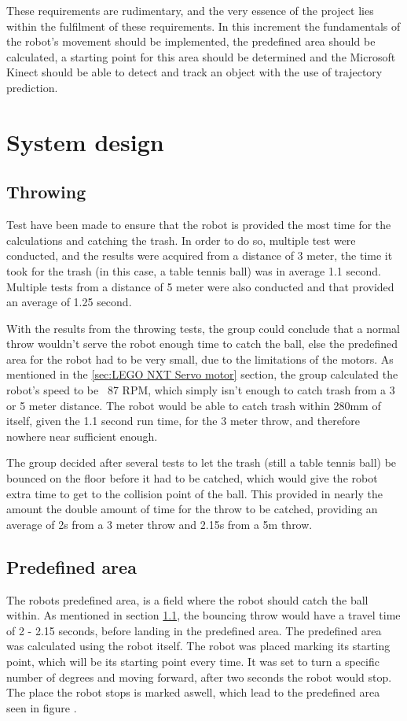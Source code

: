 These requirements are rudimentary, and the very essence of the project lies within the fulfilment of these requirements. In this increment the fundamentals of the robot’s movement should be implemented, the predefined area should be calculated, a starting point for this area should be determined and the Microsoft Kinect should be able to detect and track an object with the use of trajectory prediction.

\section{System design}
\label{sec:i1System Design}

\subsection{Throwing}
\label{sec:i1Throwing}
Test have been made to ensure that the robot is provided the most time for the calculations and catching the trash. In order to do so, multiple test were conducted, and the results were acquired from a distance of 3 meter, the time it took for the trash (in this case, a table tennis ball) was in average 1.1 second. Multiple tests from a distance of 5 meter were also conducted and that provided an average of 1.25 second. 

With the results from the throwing tests, the group could conclude that a normal throw wouldn't serve the robot enough time to catch the ball, else the predefined area for the robot had to be very small, due to the limitations of the motors. As mentioned in the \ref{sec:LEGO NXT Servo motor} section, the group calculated the robot's speed to be ~87 RPM, which simply isn't enough to catch trash from a 3 or 5 meter distance. The robot would be able to catch trash within 280mm of itself, given the 1.1 second run time, for the 3 meter throw, and therefore nowhere near sufficient enough. 

The group decided after several tests to let the trash (still a table tennis ball) be bounced on the floor before it had to be catched, which would give the robot extra time to get to the collision point of the ball. This provided in nearly the amount the double amount of time for the throw to be catched, providing an average of 2s from a 3 meter throw and 2.15s from a 5m throw.

\subsection{Predefined area}
\label{sec:i1Predefined area}
The robots predefined area, is a field where the robot should catch the ball within. As mentioned in  section \ref{sec:i1Throwing}, the bouncing throw would have a travel time of 2 - 2.15 seconds, before landing in the predefined area. The predefined area was calculated using the robot itself. The robot was placed marking its starting point, which will be its starting point every time. It was set to turn a specific number of degrees and moving forward, after two seconds the robot would stop. The place the robot stops is marked aswell, which lead to the predefined area seen in figure \label{figure:Predefined area}.

